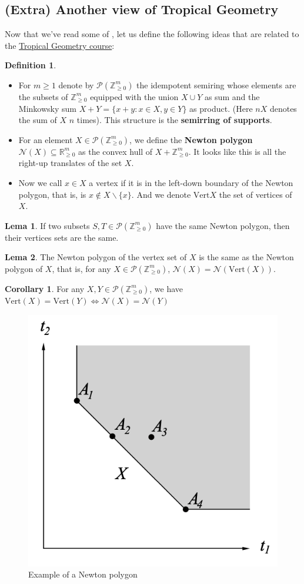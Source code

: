 \documentclass{article}
\theoremstyle{definition}
\newtheorem*{lema}{Lema}
\newtheorem{cor}{Corollary}
\newtheorem*{defn}{Definition}
\newcommand{\R}{\mathbb{R}}
\newcommand{\Z}{\mathbb{Z}}
\newcommand{\Ver}{\text{Vert}}
\begin{document}
\subsection{(Extra) Another view of Tropical Geometry}
Now that we've read some of \cite{falkensteiner2020fundamental}, let us define the following ideas that are related to the \hyperref[tropgeom]{Tropical Geometry course}:
\begin{defn}\leavevmode
\begin{itemize}
    \item For $m\geq1$ denote by $\mathcal P(\Z_{\geq0}^m)$ the idempotent semiring whose elements are the subsets of $\Z_{\geq0}^m$ equipped with the union $X\cup Y$ as sum and the Minkowsky sum $X+Y=\{x+y:x\in X, y\in Y\}$ as product. (Here $nX$ denotes the sum of $X$ $n$ times). This structure is the \textbf{semirring of supports}.
    \item For an element $X\in\mathcal P(\Z_{\geq0}^m)$, we define the \textbf{Newton polygon} $\mathcal N(X)\subseteq \R^m_{\geq0}$ as the convex hull of $X+\Z_{\geq0}^m$. It looks like this is all the right-up translates of the set $X$.
    \item Now we call $x\in X$ a vertex if it is in the left-down boundary of the Newton polygon, that is, is $x\notin X\backslash \{x\}$. And we denote $\Ver X$ the set of vertices of $X$.
\end{itemize}
\end{defn}
\begin{lema}
    If two subsets $S,T\in\mathcal P(\Z_{\geq0}^m)$ have the same Newton polygon, then their vertices sets are the same.
\end{lema}
\begin{lema}
    The Newton polygon of the vertex set of $X$ is the same as the Newton polygon of $X$, that is, for any $X\in\mathcal P(\Z_{\geq0}^m)$, $\mathcal{N}(X)=\mathcal{N}(\Ver(X))$.
\end{lema}
\begin{cor}
\label{dfcor1}
    For any $X,Y\in\mathcal P(\Z_{\geq0}^m)$, we have $\Ver(X)=\Ver(Y)\iff\mathcal{N}(X)=\mathcal{N}(Y)$
\end{cor}
 \begin{figure}[H]
		\centering
		\includegraphics[width=0.5\linewidth]{df1}
		\caption*{Example of a Newton polygon}
		\label{fig:4}
	\end{figure}
\end{document}
